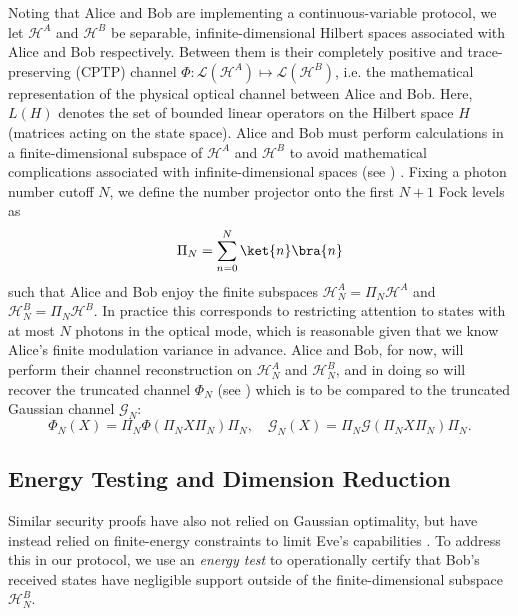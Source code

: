 ﻿\documentclass[12pt]{article}
\begin{document}
Noting that Alice and Bob are implementing a continuous-variable protocol, we let $\mathcal{H}^{A}$ and $\mathcal{H}^{B}$ be separable, infinite-dimensional Hilbert spaces associated with Alice and Bob respectively. Between them is their completely positive and trace-preserving (CPTP) channel $\Phi: \mathcal{L}(\mathcal{H}^{A}) \mapsto \mathcal{L}(\mathcal{H}^{B})$, i.e. the mathematical representation of the physical optical channel between Alice and Bob. Here, $L(H)$ denotes the set of bounded linear operators on the Hilbert space $H$ (matrices acting on the state space). Alice and Bob must perform calculations in a finite-dimensional subspace of $\mathcal{H}^{A}$ and $\mathcal{H}^{B}$ to avoid mathematical complications associated with infinite-dimensional spaces (see ) \cite{Lobino-2008, Rahimi-Keshari-2011}. Fixing a photon number cutoff $N$, we define the number projector onto the first $N + 1$ Fock levels as
\begin{equation}
\label{eq: number projector}
\Pi_N=\sum_{n=0}^N\ket{n}\bra{n}
\end{equation}
such that Alice and Bob enjoy the finite subspaces $\mathcal{H}_N^{A} = \Pi_N \mathcal{H}^{A}$ and $\mathcal{H}_N^{B} = \Pi_N \mathcal{H}^{B}$. In practice this corresponds to restricting attention to states with at most $N$ photons in the optical mode, which is reasonable given that we know Alice's finite modulation variance in advance. Alice and Bob, for now, will perform their channel reconstruction on $\mathcal{H}_N^{A}$ and $\mathcal{H}_N^{B}$, and in doing so will recover the truncated channel $\Phi_N$ (see ) which is to be compared to the truncated Gaussian channel $\mathcal{G}_N$:
\begin{equation}
\label{eq: truncated channel}
\Phi_N(X) = \Pi_N \Phi(\Pi_N X \Pi_N) \Pi_N, \quad \mathcal{G}_N(X) = \Pi_N \mathcal{G}(\Pi_N X \Pi_N) \Pi_N.
\end{equation}

\subsection{Energy Testing and Dimension Reduction}
\label{subsec: energy test}

Similar security proofs have also not relied on Gaussian optimality, but have instead relied on finite-energy constraints to limit Eve's capabilities \cite{Kaur-2021}. To address this in our protocol, we use an \textit{energy test} to operationally certify that Bob's received states have negligible support outside of the finite-dimensional subspace $\mathcal{H}_N^{B}$. 
\end{document}
